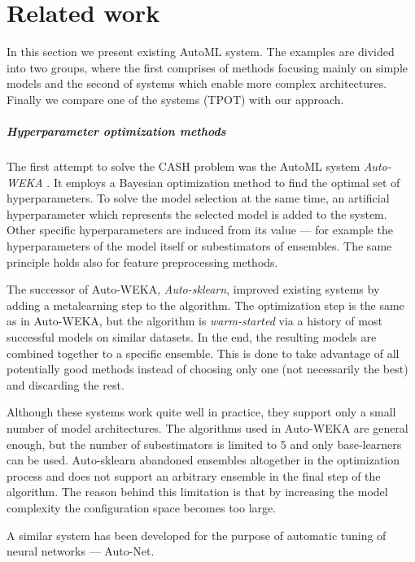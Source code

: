 \chapter{Related work} \label{ch2:related}
In this section we present existing AutoML system. The examples are divided into
two groups, where the first comprises of methods focusing mainly on simple
models and the second of systems which enable more complex architectures.
Finally we compare one of the systems (TPOT) with our approach.

\paragraph{Hyperparameter optimization methods} \label{CASH}
The first attempt to solve the CASH problem was the AutoML system \emph{Auto-WEKA}
\citep{DBLP:journals/corr/abs-1208-3719}. It employs a Bayesian optimization
method to find the optimal set of hyperparameters. To solve the model selection
at the same time, an artificial hyperparameter which represents the selected
model is added to the system. Other specific hyperparameters are induced from its
value --- for example the hyperparameters of the model itself or subestimators of
ensembles. The same principle holds also for feature preprocessing methods.

The successor of Auto-WEKA, \emph{Auto-sklearn}, improved existing systems by
adding a metalearning step to the algorithm. The optimization step is the same
as in Auto-WEKA, but the algorithm is \emph{warm-started} via a history of most
successful models on similar datasets. In the end, the resulting models are
combined together to a specific ensemble. This is done to take advantage of all
potentially good methods instead of choosing only one (not necessarily the best)
and discarding the rest. \citep{Feurer:2015:ERA:2969442.2969547}

Although these systems work quite well in practice, they support only a small
number of model architectures. The algorithms used in Auto-WEKA are general
enough, but the number of subestimators is limited to 5 and only base-learners can
be used. Auto-sklearn abandoned ensembles altogether in the optimization process
and does not support an arbitrary ensemble in the final step of the algorithm.
The reason behind this limitation is that by increasing the model complexity the
configuration space becomes too large.

A similar system has been developed for the purpose of automatic tuning of neural
networks --- Auto-Net. \citep{pmlr-v64-mendoza_towards_2016}

